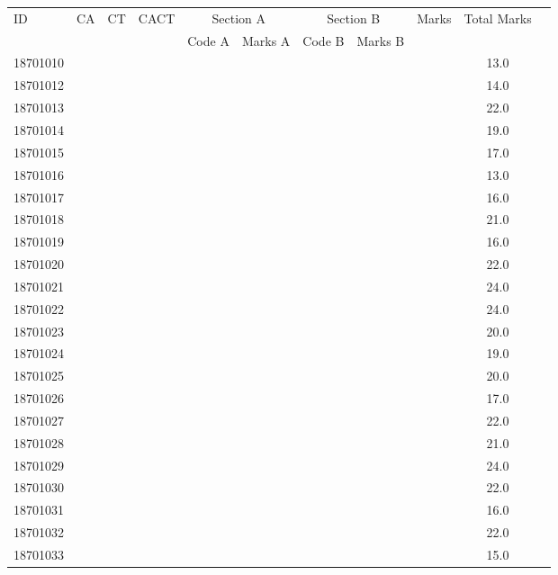 \documentclass[12pt]{article}
\begin{document}
    \begin{center} 
	\renewcommand{\arraystretch}{1.08}
	\begin{small}
    \begin{tabular}{|l|c|c|c|c|c|c|c|c|c|c|} \hline
	\multirow{2}{*}{ID} & 	\multirow{2}{*}{CA}  & 	\multirow{2}{*}{CT}  & 	\multirow{2}{*}{CACT}  & \multicolumn{2 }{c|}{Section A}& \multicolumn{2 }{c|}{Section B} & 	\multirow{2}{*}{Marks}  & 	\multirow{2}{*}{Total Marks}  \\ 
	&  &  &  & Code A & Marks A & Code B & Marks B&  &  \\ \hline
18701010 &  &  &  &  &  &  &  &  & 13.0\\ \hline 
18701012 &  &  &  &  &  &  &  &  & 14.0\\ \hline 
18701013 &  &  &  &  &  &  &  &  & 22.0\\ \hline 
18701014 &  &  &  &  &  &  &  &  & 19.0\\ \hline 
18701015 &  &  &  &  &  &  &  &  & 17.0\\ \hline 
18701016 &  &  &  &  &  &  &  &  & 13.0\\ \hline 
18701017 &  &  &  &  &  &  &  &  & 16.0\\ \hline 
18701018 &  &  &  &  &  &  &  &  & 21.0\\ \hline 
18701019 &  &  &  &  &  &  &  &  & 16.0\\ \hline 
18701020 &  &  &  &  &  &  &  &  & 22.0\\ \hline 
18701021 &  &  &  &  &  &  &  &  & 24.0\\ \hline 
18701022 &  &  &  &  &  &  &  &  & 24.0\\ \hline 
18701023 &  &  &  &  &  &  &  &  & 20.0\\ \hline 
18701024 &  &  &  &  &  &  &  &  & 19.0\\ \hline 
18701025 &  &  &  &  &  &  &  &  & 20.0\\ \hline 
18701026 &  &  &  &  &  &  &  &  & 17.0\\ \hline 
18701027 &  &  &  &  &  &  &  &  & 22.0\\ \hline 
18701028 &  &  &  &  &  &  &  &  & 21.0\\ \hline 
18701029 &  &  &  &  &  &  &  &  & 24.0\\ \hline 
18701030 &  &  &  &  &  &  &  &  & 22.0\\ \hline 
18701031 &  &  &  &  &  &  &  &  & 16.0\\ \hline 
18701032 &  &  &  &  &  &  &  &  & 22.0\\ \hline 
18701033 &  &  &  &  &  &  &  &  & 15.0\\ \hline 

\end{tabular}
\end{small}
\end{center}
\end{document}
